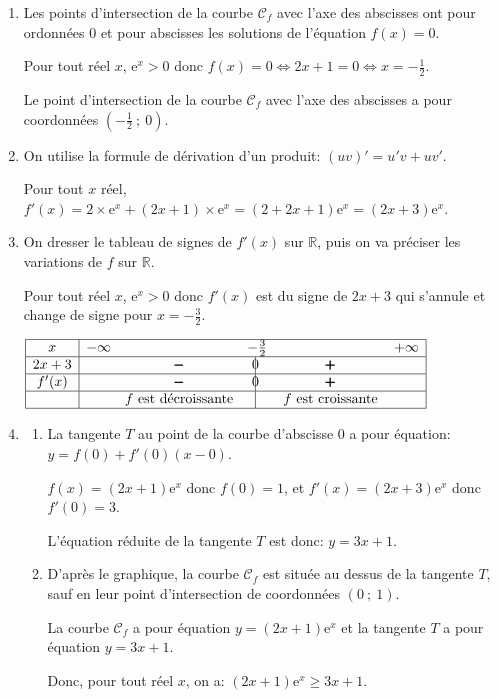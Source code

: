 \documentclass[10pt]{article}
\providecommand{\R}{\mathbb{R}}
\providecommand{\e}{{\mathrm{e}}}
\begin{document}
\begin{enumerate}
\item  Les  points d'intersection de la courbe $\mathcal{C}_f$  avec l'axe des abscisses ont pour ordonnées 0 et pour abscisses les solutions de l'équation $f(x)=0$.

Pour tout réel $x$, $\e^{x}>0$ donc $f(x)=0 \iff 2x+1=0 \iff x = -\frac{1}{2}$.

Le point d'intersection de la courbe $\mathcal{C}_f$  avec l'axe des abscisses a pour coordonnées $\left ( -\frac{1}{2}~;~0\right )$.

\item On utilise la formule de dérivation d'un produit: $(uv)'=u'v+uv'$.

Pour tout $x$ réel,  $f'(x)= 2\times \e^{x} + (2x+1)\times \e^{x} = (2+2x+1)\e^{x} = (2x+3)\e^{x}$.

\item On dresser le tableau de signes de $f'(x)$ sur $\R$, puis on va préciser les variations de $f$ sur $\R$.

Pour tout réel $x$, $\e^{x}>0$ donc $f'(x)$ est du signe de $2x+3$ qui s'annule et change de signe pour $x=-\frac{3}{2}$.

\begin{center}
{\renewcommand{\arraystretch}{1.3}
\def\esp{\hspace*{2.5cm}}
\def\hauteur{0pt}
$\begin{array}{|c| *4{c} c|}
\hline
 x &-\infty  & \esp & -\frac{3}{2} & \esp & +\infty \\
  \hline
2x+3 &  &  \pmb{-} & \vline\hspace{-2.7pt}0 & \pmb{+} & \\  
 \hline
f'(x) &  &  \pmb{-} & \vline\hspace{-2.7pt}0 & \pmb{+} & \\  
\hline
 && f \text{ est décroissante} & \vline\hspace{-2.7pt}{\phantom 0} & f \text{ est croissante} & \\
\hline
\end{array}$
}
\end{center}

\item \begin{enumerate}
\item La tangente $T$ au point de la courbe d'abscisse 0 a pour équation:
$y=f(0)+f'(0)\left (x-0\right )$.

$f(x)=(2x+1)\e^{x}$ donc $f(0)=1$, et $f'(x)=(2x+3)\e^{x}$ donc $f'(0)=3$.

L'équation réduite de la tangente $T$ est donc: $y=3x+1$.
 
\item
D'après le graphique, la courbe $\mathcal{C}_f$ est située au dessus de la tangente $T$, sauf en leur point d'intersection de coordonnées $(0~;~1)$.

La courbe $\mathcal{C}_f$ a pour équation $y=(2x+1)\e^{x}$ et  la tangente $T$ a pour équation $y=3x+1$.

Donc, pour tout réel $x$, on a: $(2x+1)\e^{x} \geqslant 3x+1$.
\end{enumerate}
\end{enumerate}

\vspace{0,5cm}
\end{document}

